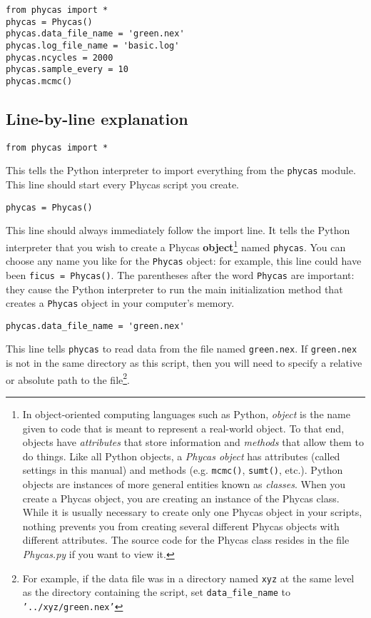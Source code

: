 \documentclass[10pt]{article}
\newcommand{\pathname}[1]{{\em #1}}
\newcommand{\code}[1]{{\tt #1}}
\newcommand{\term}[1]{{\bfseries #1}\index{#1}}
\newcommand{\setting}[1]{{\tt \small #1}\index{#1}}
\begin{document}
\begin{verbatim}
from phycas import *
phycas = Phycas()
phycas.data_file_name = 'green.nex'
phycas.log_file_name = 'basic.log'
phycas.ncycles = 2000
phycas.sample_every = 10
phycas.mcmc()
\end{verbatim}

\subsection{Line-by-line explanation} \label{subsec:basicpyexplanation}

\begin{verbatim}
from phycas import *
\end{verbatim}
%
This tells the Python interpreter to import everything from the \code{phycas} module. This line should start every Phycas script you create.
%
\begin{verbatim}
phycas = Phycas()
\end{verbatim}
%
This line should always immediately follow the import line. It tells the Python interpreter that you wish to create a Phycas \term{object}\footnote{
%
In object-oriented computing languages such as Python, {\em object} is the name given to code that is meant to represent a real-world object. To that end, objects have {\em attributes} that store information and {\em methods} that allow them to do things. Like all Python objects, a {\em Phycas object} has attributes (called settings in this manual) and methods (e.g. \code{mcmc()}, \code{sumt()}, etc.). Python objects are instances of more general entities known as {\em classes}. When you create a Phycas object, you are creating an instance of the Phycas class. While it is usually necessary to create only one Phycas object in your scripts, nothing prevents you from creating several different Phycas objects with different attributes. The source code for the Phycas class resides in the file \pathname{Phycas.py} if you want to view it.} 
%
named \code{phycas}.
You can choose any name you like for the \code{Phycas} object: for example, this line could have been \code{ficus = Phycas()}. The parentheses after the word \code{Phycas} are important: they cause the Python interpreter to run the main initialization method that creates a \code{Phycas} object in your computer's memory.
%
\begin{verbatim}
phycas.data_file_name = 'green.nex'
\end{verbatim}
%
This line tells \code{phycas} to read data from the file named {\tt green.nex}. If {\tt green.nex} is not in the same directory as this script, then you will need to specify a relative or absolute path to the file\footnote{
%
For example, if the data file was in a directory named {\tt xyz} at the same level as the directory containing the script, set \setting{data\_file\_name} to {\tt '../xyz/green.nex'} }.
\end{document}
